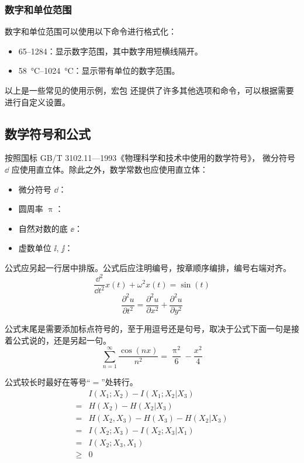 \subsubsection*{数字和单位范围}

数字和单位范围可以使用以下命令进行格式化：

\begin{itemize}
  \item \numrange{65}{1284}：显示数字范围，其中数字用短横线隔开。
  \item \SIrange{58}{1024}{\degreeCelsius}：显示带有单位的数字范围。
\end{itemize}

以上是一些常见的使用示例，宏包  还提供了许多其他选项和命令，可以根据需要进行自定义设置。

\subsection{数学符号和公式}

按照国标 GB/T 3102.11—1993《物理科学和技术中使用的数学符号》，
微分符号 $\dd$ 应使用直立体。除此之外，数学常数也应使用直立体：
\begin{itemize}
  \item 微分符号 $\dd$：
  \item 圆周率 $\uppi$：
  \item 自然对数的底 $\ee$：
  \item 虚数单位 $\ii$, $\jj$： 
\end{itemize}

公式应另起一行居中排版。公式后应注明编号，按章顺序编排，编号右端对齐。
\begin{equation}
  \frac{\dd^2}{\dd t^2}x(t)+\omega^2x(t)=\sin(t)
\end{equation}
\begin{equation}
  \frac{\partial^2u}{\partial t^2}=\frac{\partial^2u}{\partial x^2}+\frac{\partial^2u}{\partial y^2}
\end{equation}

公式末尾是需要添加标点符号的，至于用逗号还是句号，取决于公式下面一句是接着公式说的，还是另起一句。
\begin{equation}
  \sum_{n=1}^{\infty}\frac{\cos(nx)}{n^2}=\frac{\uppi^2}{6}-\frac{x^2}{4}
\end{equation}

公式较长时最好在等号“$=$”处转行。
\begin{align}
       & I(X_1;X_2)-I(X_1;X_2|X_3) \nonumber    \\
  =    & H(X_2)-H(X_2|X_3) \nonumber            \\
  =    & H(X_2,X_3)-H(X_3)-H(X_2|X_3) \nonumber \\
  =    & I(X_2;X_3)-I(X_2;X_3|X_1) \nonumber    \\
  =    & I(X_2;X_3,X_1) \nonumber               \\
  \geq & 0                                      
\end{align}

